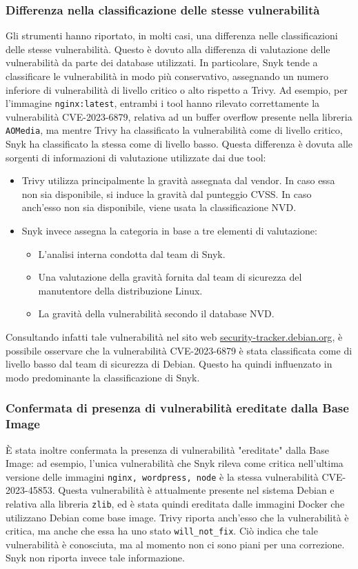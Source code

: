 \subsubsection{Differenza nella classificazione delle stesse vulnerabilità}
Gli strumenti hanno riportato, in molti casi, una differenza nelle classificazioni delle stesse vulnerabilità. Questo è dovuto alla differenza di valutazione delle vulnerabilità da parte dei database utilizzati. In particolare, Snyk tende a classificare le vulnerabilità in modo più conservativo, assegnando un numero inferiore di vulnerabilità di livello critico o alto rispetto a Trivy. Ad esempio, per l'immagine \texttt{nginx:latest}, entrambi i tool hanno rilevato correttamente la vulnerabilità CVE-2023-6879, relativa ad un buffer overflow presente nella libreria \texttt{AOMedia}, ma mentre Trivy ha classificato la vulnerabilità come di livello critico, Snyk ha classificato la stessa come di livello basso. Questa differenza è dovuta alle sorgenti di informazioni di valutazione utilizzate dai due tool:
\begin{itemize}
   \item Trivy utilizza principalmente la gravità assegnata dal vendor. In caso essa non sia disponibile, si induce la gravità dal punteggio CVSS. In caso anch'esso non sia disponibile, viene usata la classificazione NVD.
   \item Snyk invece assegna la categoria in base a tre elementi di valutazione:
         \begin{itemize}
            \item L'analisi interna condotta dal team di Snyk.
            \item Una valutazione della gravità fornita dal team di sicurezza del manutentore della distribuzione Linux.
            \item La gravità della vulnerabilità secondo il database NVD.
         \end{itemize}
\end{itemize}
Consultando infatti tale vulnerabilità nel sito web \url{security-tracker.debian.org}, è possibile osservare che la vulnerabilità CVE-2023-6879 è stata classificata come di livello basso dal team di sicurezza di Debian. Questo ha quindi influenzato in modo predominante la classificazione di Snyk.
\subsubsection{Confermata di presenza di vulnerabilità ereditate dalla Base Image}
È stata inoltre confermata la presenza di vulnerabilità "ereditate" dalla Base Image: ad esempio, l'unica vulnerabilità che Snyk rileva come critica nell'ultima versione delle immagini \texttt{nginx, wordpress, node} è la stessa vulnerabilità CVE-2023-45853. Questa vulnerabilità è attualmente presente nel sistema Debian e relativa alla libreria \texttt{zlib}, ed è stata quindi ereditata dalle immagini Docker che utilizzano Debian come base image.
Trivy riporta anch'esso che la vulnerabilità è critica, ma anche che essa ha uno stato \texttt{will\_not\_fix}. Ciò indica che tale vulnerabilità è conosciuta, ma al momento non ci sono piani per una correzione. Snyk non riporta invece tale informazione.


